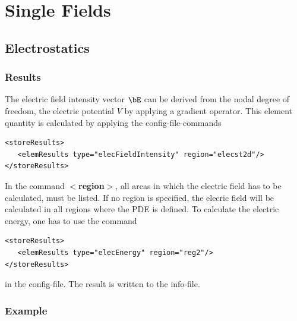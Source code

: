 \chapter{Single Fields}

\section{Electrostatics}
\subsection{Results}
The electric field intensity vector $\bE$ can be derived from the
nodal degree of freedom, the electric potential $V$ by applying a
gradient operator. This element quantity is calculated by applying
the config-file-commands

\begin{verbatim}
<storeResults>
   <elemResults type="elecFieldIntensity" region="elecst2d"/>
</storeResults>
\end{verbatim}

In the command {\bf $<$region$>$}, all areas in which the electric field has to
be calculated, must be listed. If no region  is specified, the elecric
field will be calculated in all regions where the PDE is defined. To
calculate the electric energy, one has to use the command 

\begin{verbatim}      
<storeResults>
   <elemResults type="elecEnergy" region="reg2"/>
</storeResults>
\end{verbatim}
in the config-file. The result is written to the info-file.


\subsection{Example}

